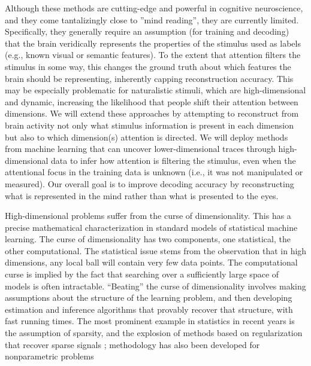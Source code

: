 Although these methods are cutting-edge and powerful in cognitive
neuroscience, and they come tantalizingly close to ''mind reading'',
they are currently limited. Specifically, they generally require an
assumption (for training and decoding) that the brain veridically
represents the properties of the stimulus used as labels (e.g., known
visual or semantic features). To the extent that attention filters the
stimulus in some way, this changes the ground truth about which
features the brain should be representing, inherently capping
reconstruction accuracy. This may be especially problematic for 
naturalistic stimuli, which are high-dimensional and dynamic, 
increasing the likelihood that people
shift their attention between dimensions. We will extend
these approaches by attempting to reconstruct from brain activity not
only what stimulus information is present in each dimension but also
to which dimension(s) attention is directed. We will deploy methods
from machine learning that can uncover lower-dimensional traces
through high-dimensional data to infer how attention is filtering the
stimulus, even when the attentional focus in the training data is
unknown (i.e., it was not manipulated or measured). Our
overall goal is to improve decoding accuracy by reconstructing what is
represented in the mind rather than what is presented to the eyes.


\statbackground{} High-dimensional problems suffer from the curse of
dimensionality. This has a precise mathematical characterization in
standard models of statistical machine learning. The curse of
dimensionality has two components, one statistical, the other
computational. The statistical issue stems from the observation that
in high dimensions, any local ball will contain very few data
points. The computational curse is implied by the fact that searching
over a sufficiently large space of models is often
intractable. ``Beating'' the curse of dimensionality involves making
assumptions about the structure of the learning problem, and then
developing estimation and inference algorithms that provably 
recover that structure, with fast running times. The most prominent 
example in statistics in recent years is the assumption of sparsity, and the explosion of methods based on regularization that recover sparse signals \citep{Tibs:1996,lars,Wain:09a,wasserman:09,Zou:Hastie:Tibs:05,FHT:07}; methodology has also been developed for nonparametric problems \citep{LZ:Cosso,Ravikumar:08,lafferty2008rodeo,NPN:09,skeptic,NRRR:NIPS}

